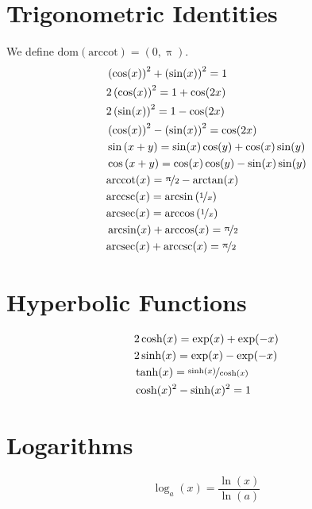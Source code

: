 \documentclass[letterpaper,landscape,9pt,fleqn]{extarticle}
\newcommand{\dom}{\mathrm{dom}}
\newcommand{\arcsec}{\mathrm{arcsec}}
\newcommand{\arccsc}{\mathrm{arccsc}}
\newcommand{\arccot}{\mathrm{arccot}}
\begin{document}
\begin{multicols*}{4}
\section*{Trigonometric Identities}
\begin{minipage}[c]{0.25\textwidth}
  We define $\dom(\arccot) = (0,\uppi)$.
\begin{align*}
  &\left(\cos(x)\right)^2 + \left(\sin(x)\right)^2 = 1 \\
  &2 \left(\cos(x)\right)^2 =  1 + \cos(2 x) \\
  &2 \left(\sin(x)\right)^2 = 1 - \cos(2 x) \\
  & \left(\cos (x)\right)^2 - \left(\sin (x) \right)^2 = \cos(2x) \\
   &\sin\left(x +  y\right) =\sin (x) \cos (y) + \cos (x) \sin (y) \\
  &\cos\left(x+y\right)=\cos (x) \cos (y) - \sin (x) \sin (y)    \\
  &\arccot(x) = \nicefrac{\uppi}{2} - \arctan(x) \\
  &\arccsc(x) = \arcsin \left (\nicefrac{1}{x} \right ) \\
  &\arcsec(x) = \arccos \left(\nicefrac{1}{x} \right) \\
  & \arcsin (x) + \arccos (x) = \nicefrac{\uppi}{2} \\
    & \arcsec (x) + \arccsc (x) = \nicefrac{\uppi}{2}
  \end{align*}
\end{minipage}
\vspace{0.1in}
\section*{Hyperbolic Functions}
\begin{align*}
  &2 \cosh(x) = \exp(x) + \exp(-x) \\
  &2 \sinh(x) = \exp(x) - \exp(-x) \\
  & \tanh(x) = \nicefrac{\sinh(x)}{\cosh(x)}\\
  &\cosh(x)^2 - \sinh(x)^2 = 1
\end{align*}
\vspace{0.1in}
  \section*{Logarithms}
      \begin{equation*}
    \log_a(x) = \frac{\ln(x)}{\ln(a)}
       \end{equation*}
\newcolumn


\end{multicols*}
\end{document}
